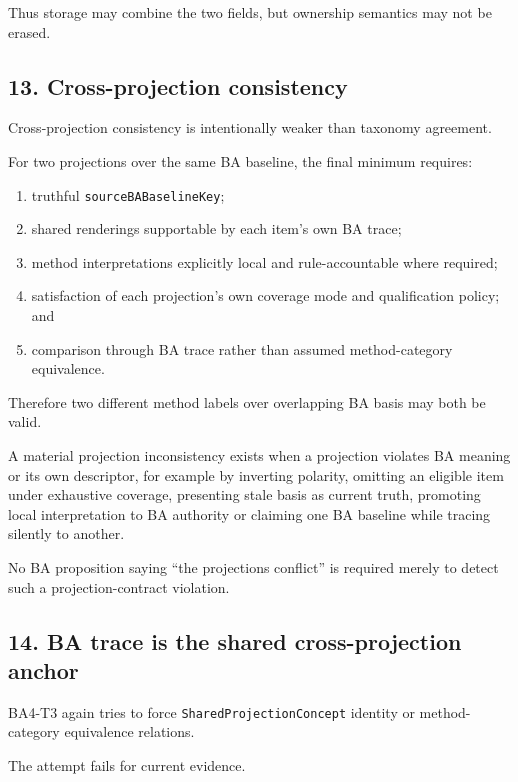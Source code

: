\documentclass[
  11pt,
  a4paper,
]{article}
\providecommand{\tightlist}{%
  \setlength{\itemsep}{0pt}\setlength{\parskip}{0pt}}
\begin{document}
Thus storage may combine the two fields, but ownership semantics may not
be erased.

\subsection{13. Cross-projection
consistency}\label{cross-projection-consistency}

Cross-projection consistency is intentionally weaker than taxonomy
agreement.

For two projections over the same BA baseline, the final minimum
requires:

\begin{enumerate}
\def\labelenumi{\arabic{enumi}.}
\tightlist
\item
  truthful \texttt{sourceBABaselineKey};
\item
  shared renderings supportable by each item's own BA trace;
\item
  method interpretations explicitly local and rule-accountable where
  required;
\item
  satisfaction of each projection's own coverage mode and qualification
  policy; and
\item
  comparison through BA trace rather than assumed method-category
  equivalence.
\end{enumerate}

Therefore two different method labels over overlapping BA basis may both
be valid.

A material projection inconsistency exists when a projection violates BA
meaning or its own descriptor, for example by inverting polarity,
omitting an eligible item under exhaustive coverage, presenting stale
basis as current truth, promoting local interpretation to BA authority
or claiming one BA baseline while tracing silently to another.

No BA proposition saying ``the projections conflict'' is required merely
to detect such a projection-contract violation.

\subsection{14. BA trace is the shared cross-projection
anchor}\label{ba-trace-is-the-shared-cross-projection-anchor}

BA4-T3 again tries to force \texttt{SharedProjectionConcept} identity or
method-category equivalence relations.

The attempt fails for current evidence.
\end{document}
